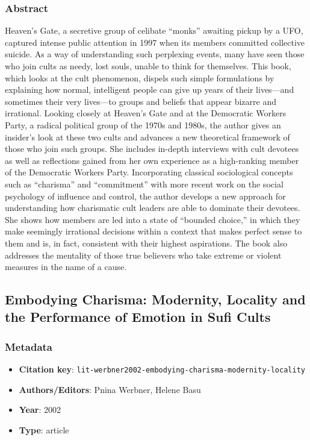\subsubsection*{Abstract}
Heaven's Gate, a secretive group of celibate “monks” awaiting pickup by a UFO, captured intense public attention in 1997 when its members committed collective suicide. As a way of understanding such perplexing events, many have seen those who join cults as needy, lost souls, unable to think for themselves. This book, which looks at the cult phenomenon, dispels such simple formulations by explaining how normal, intelligent people can give up years of their lives—and sometimes their very lives—to groups and beliefs that appear bizarre and irrational. Looking closely at Heaven's Gate and at the Democratic Workers Party, a radical political group of the 1970s and 1980s, the author gives an insider's look at these two cults and advances a new theoretical framework of those who join such groups. She includes in-depth interviews with cult devotees as well as reflections gained from her own experience as a high-ranking member of the Democratic Workers Party. Incorporating classical sociological concepts such as “charisma” and “commitment” with more recent work on the social psychology of influence and control, the author develops a new approach for understanding how charismatic cult leaders are able to dominate their devotees. She shows how members are led into a state of “bounded choice,” in which they make seemingly irrational decisions within a context that makes perfect sense to them and is, in fact, consistent with their highest aspirations. The book also addresses the mentality of those true believers who take extreme or violent measures in the name of a cause.

\subsection{Embodying Charisma: Modernity, Locality and the Performance of Emotion in Sufi Cults}\label{lit:lit-werbner2002-embodying-charisma-modernity-locality}
\subsubsection*{Metadata}
\begin{itemize}
  \item \textbf{Citation key}: \texttt{lit-werbner2002-embodying-charisma-modernity-locality}
  \item \textbf{Authors/Editors}: Pnina Werbner, Helene Basu
  \item \textbf{Year}: 2002
  \item \textbf{Type}: article
\end{itemize}
